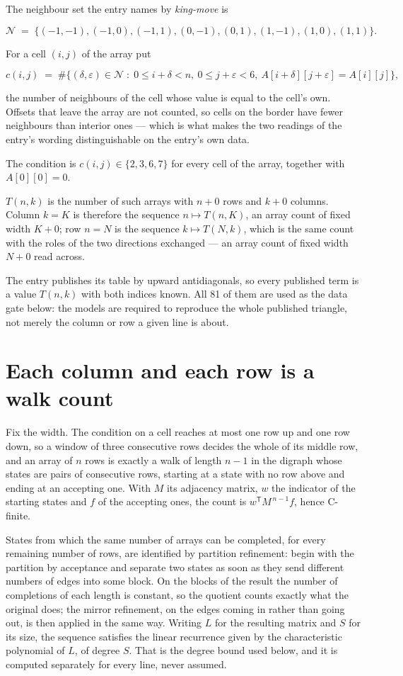 \documentclass[11pt]{article}
\theoremstyle{definition}
\begin{document}
The neighbour set the entry names by {\itshape king-move} is

\[\mathcal{N} \;=\; \{(-1,-1), (-1,0), (-1,1), (0,-1), (0,1), (1,-1), (1,0), (1,1)\}.\]

For a cell $(i,j)$ of the array put

\[c(i,j) \;=\; \#\bigl\{(\delta,\varepsilon)\in\mathcal{N} \;:\; 0\le i+\delta<n,\ 0\le j+\varepsilon<6,\ A[i+\delta][j+\varepsilon] = A[i][j]\bigr\},\]

the number of neighbours of the cell whose value is equal to the cell's own. Offsets that leave the array are not counted, so cells on the border have fewer neighbours than interior ones --- which is what makes the two readings of the entry's wording distinguishable on the entry's own data.

The condition is $c(i,j) \in \{2, 3, 6, 7\}$ for every cell of the array, together with $A[0][0]=0$.

$T(n,k)$ is the number of such arrays with $n + 0$ rows and $k + 0$ columns. Column $k = K$ is therefore the sequence $n \mapsto T(n,K)$, an array count of fixed width $K + 0$; row $n = N$ is the sequence $k \mapsto T(N,k)$, which is the same count with the roles of the two directions exchanged --- an array count of fixed width $N + 0$ read across.

The entry publishes its table by upward antidiagonals, so every published term is a value $T(n,k)$ with both indices known. All 81 of them are used as the data gate below: the models are required to reproduce the whole published triangle, not merely the column or row a given line is about.

\section{Each column and each row is a walk count}

Fix the width. The condition on a cell reaches at most one row up and one row down, so a window of three consecutive rows decides the whole of its middle row, and an array of $n$ rows is exactly a walk of length $n-1$ in the digraph whose states are pairs of consecutive rows, starting at a state with no row above and ending at an accepting one. With $M$ its adjacency matrix, $w$ the indicator of the starting states and $f$ of the accepting ones, the count is $w^{\mathsf T}M^{\,n-1}f$, hence C-finite.

States from which the same number of arrays can be completed, for every remaining number of rows, are identified by partition refinement: begin with the partition by acceptance and separate two states as soon as they send different numbers of edges into some block. On the blocks of the result the number of completions of each length is constant, so the quotient counts exactly what the original does; the mirror refinement, on the edges coming in rather than going out, is then applied in the same way. Writing $L$ for the resulting matrix and $S$ for its size, the sequence satisfies the linear recurrence given by the characteristic polynomial of $L$, of degree $S$. That is the degree bound used below, and it is computed separately for every line, never assumed.
\end{document}
